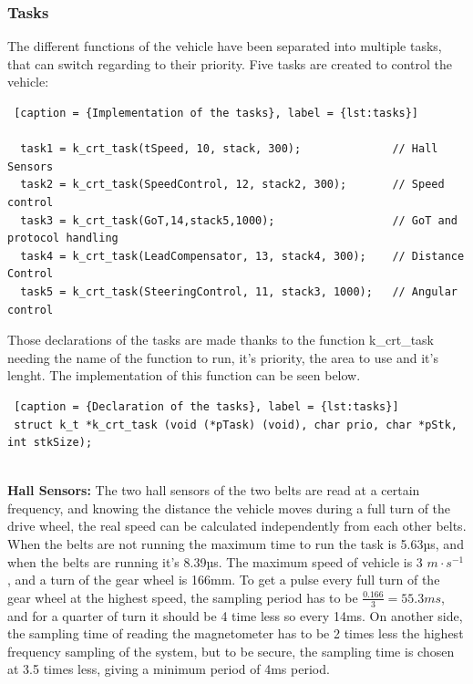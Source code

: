 \subsubsection{Tasks}
The different functions of the vehicle have been separated into multiple tasks, that can switch regarding to their priority. Five tasks are created to control the vehicle:

\begin{lstlisting} [caption = {Implementation of the tasks}, label = {lst:tasks}]

  task1 = k_crt_task(tSpeed, 10, stack, 300);         	   // Hall Sensors
  task2 = k_crt_task(SpeedControl, 12, stack2, 300); 	   // Speed control
  task3 = k_crt_task(GoT,14,stack5,1000);        		   // GoT and protocol handling
  task4 = k_crt_task(LeadCompensator, 13, stack4, 300);    // Distance Control
  task5 = k_crt_task(SteeringControl, 11, stack3, 1000);   // Angular control

\end{lstlisting}

Those declarations of the tasks are made thanks to the function k\_crt\_task needing the name of the function to run, it's priority, the area to use and it's lenght. The implementation of this function can be seen below.


\begin{lstlisting} [caption = {Declaration of the tasks}, label = {lst:tasks}]
 struct k_t *k_crt_task (void (*pTask) (void), char prio, char *pStk, int stkSize);
 
\end{lstlisting}


\textbf{Hall Sensors:}
The two hall sensors of the two belts are read at a certain frequency, and knowing the distance the vehicle moves during a full turn of the drive wheel, the real speed can be calculated independently from each other belts.\\
When the belts are not running the maximum time to run the task is 5.63µs, and when the belts are running it's 8.39µs.
The maximum speed of vehicle is 3 $m \cdot s^{-1}$, and a turn of the gear wheel is 166mm. To get a pulse every full turn of the gear wheel at the highest speed, the sampling period has to be $\frac{0.166}{3}={55.3ms}$, and for a quarter of turn it should be 4 time less so every 14ms. On another side, the sampling time of reading the magnetometer has to be 2 times less the highest frequency sampling of the system, but to be secure, the sampling time is chosen at 3.5 times less, giving a minimum period of 4ms period.


